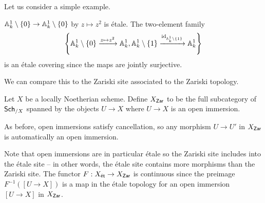 Let us consider a simple example. 
\begin{example}
    $\mathbb{A}^{1}_{k}\setminus\{0\}\to\mathbb{A}^{1}_{k}\setminus\{0\}$ by $z\mapsto z^{2}$ is \'{e}tale. The two-element family $$\left\{\mathbb{A}^{1}_{k}\setminus\{0\}\xrightarrow{z\mapsto z^{2}}\mathbb{A}^{1}_{k},\mathbb{A}^{1}_{k}\setminus\{1\}\xrightarrow{\mathrm{id}_{\mathbb{A}^{1}_{k}\setminus\{1\}}}\mathbb{A}^{1}_{k}\right\}$$ 
    is an \'{e}tale covering since the maps are jointly surjective. 
\end{example}
We can compare this to the Zariski site associated to the Zariski topology. 
\begin{definition}\label{def: Zariski site}
    Let $X$ be a locally Noetherian scheme. Define $X_{\mathsf{Zar}}$ to be the full subcategory of $\mathsf{Sch}_{/X}$ spanned by the objects $U\to X$ where $U\to X$ is an open immersion. 
\end{definition}
\begin{remark}
    As before, open immersions satisfy cancellation, so any morphism $U\to U'$ in $X_{\mathsf{Zar}}$ is automatically an open immersion. 
\end{remark}
Note that open immersions are in particular \'{e}tale so the Zariski site includes into the \'{e}tale site -- in other words, the \'{e}tale site contains more morphisms than the Zariski site. The functor $F:X_{\mathsf{\acute{e}t}}\to X_{\mathsf{Zar}}$ is continuous since the preimage $F^{-1}([U\to X])$ is a map in the \'{e}tale topology for an open immersion $[U\to X]$ in $X_{\mathsf{Zar}}$. 

